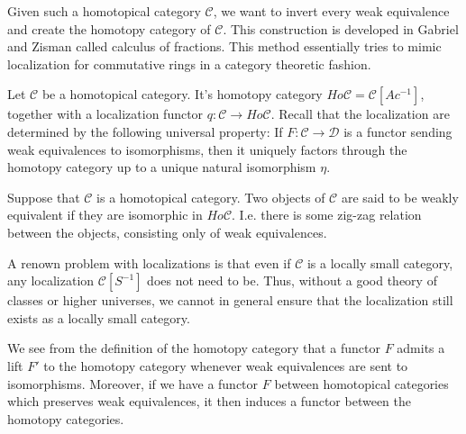 \documentclass[../thesis.tex]{subfiles}
\begin{document}
            Given such a homotopical category $\mathcal{C}$, we want to invert every weak equivalence and create the homotopy category of $\mathcal{C}$. This construction is developed in Gabriel and Zisman \cite{Zisman67} called calculus of fractions. This method essentially tries to mimic localization for commutative rings in a category theoretic fashion.

            \begin{definition}
                Let $\mathcal{C}$ be a homotopical category. It's homotopy category $Ho\mathcal{C} = \mathcal{C}[Ac^{-1}]$, together with a localization functor $q:\mathcal{C}\rightarrow Ho\mathcal{C}$. Recall that the localization are determined by the following universal property: If $F:\mathcal{C}\rightarrow \mathcal{D}$ is a functor sending weak equivalences to isomorphisms, then it uniquely factors through the homotopy category up to a unique natural isomorphism $\eta$.

                \begin{center}
                \end{center}
            \end{definition}

            \begin{definition}
                Suppose that $\mathcal{C}$ is a homotopical category. Two objects of $\mathcal{C}$ are said to be weakly equivalent if they are isomorphic in $Ho\mathcal{C}$. I.e. there is some zig-zag relation between the objects, consisting only of weak equivalences.
            \end{definition}

            \begin{remark}
                A renown problem with localizations is that even if $\mathcal{C}$ is a locally small category, any localization $\mathcal{C}[S^{-1}]$ does not need to be. Thus, without a good theory of classes or higher universes, we cannot in general ensure that the localization still exists as a locally small category.
            \end{remark}

            We see from the definition of the homotopy category that a functor $F$ admits a lift $F'$ to the homotopy category whenever weak equivalences are sent to isomorphisms. Moreover, if we have a functor $F$ between homotopical categories which preserves weak equivalences, it then induces a functor between the homotopy categories.
            
\end{document}
